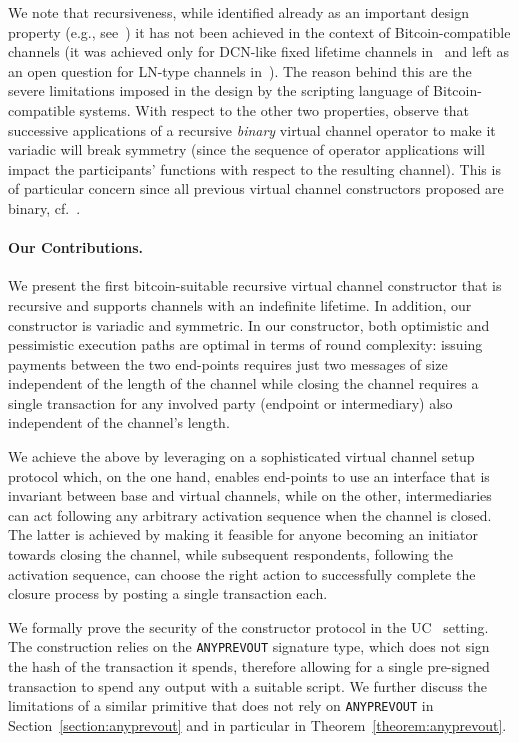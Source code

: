 We note that recursiveness, while identified already as an important design property (e.g., see~\cite{DBLP:conf/ccs/DziembowskiFH18}) it has not been achieved in the context of Bitcoin-compatible channels 
(it was achieved only for DCN-like fixed lifetime channels in~\cite{10.1007/978-3-030-65411-5_18} and left as an open question for LN-type channels in~\cite{cryptoeprint:2020:554}). 
The reason behind this are the severe limitations imposed in the design by the scripting language of Bitcoin-compatible systems. 
%
With respect to the other two properties, observe that successive applications of a recursive {\em binary} virtual channel operator to make it variadic will break symmetry (since the sequence of operator applications will impact the participants' functions with respect to the resulting channel). This is of particular concern since all previous virtual channel constructors proposed are binary, cf.~\cite{DBLP:conf/ccs/DziembowskiFH18,cryptoeprint:2020:554,10.1007/978-3-030-65411-5_18}. 

\paragraph{Our Contributions.}  We present  the first  bitcoin-suitable recursive virtual channel constructor that is recursive and supports channels with an indefinite lifetime. In addition, our constructor is variadic and symmetric. In our constructor, both optimistic and pessimistic execution paths are optimal in terms of round complexity: issuing payments between the two end-points requires just two messages of size independent of the length of the channel while
closing the channel requires a single transaction for any involved party (endpoint or intermediary) also independent of the channel's length. 

We achieve the above by leveraging on a sophisticated virtual channel setup protocol which, on the one hand, enables end-points to use an interface that is invariant between base and virtual channels, 
while on the other, intermediaries can act following any arbitrary activation sequence when the channel is closed. The latter is achieved by making it feasible for anyone becoming an initiator towards closing the channel, while subsequent respondents, following the activation sequence, can choose the right action to successfully complete the closure process by posting a single transaction each. 

  We formally prove the security of the constructor protocol in the  UC~\cite{uc} setting. The construction relies on the \texttt{ANYPREVOUT}   signature type, which does not sign the hash of the transaction it spends, therefore allowing for a single pre-signed transaction to spend any output
  with a suitable script. We further discuss the limitations of a similar
  primitive that does not rely on \texttt{ANYPREVOUT} in
  Section~\ref{section:anyprevout} and in particular in Theorem~\ref{theorem:anyprevout}.
 
